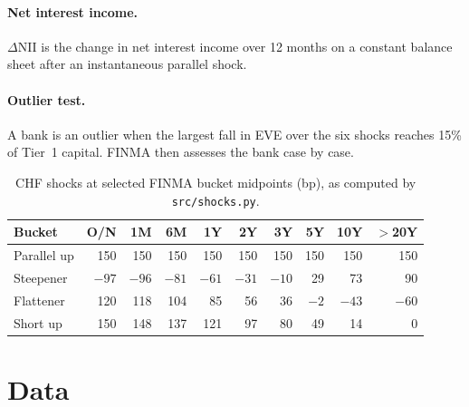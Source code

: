 \documentclass[11pt,a4paper]{article}
\newcommand{\dNII}{$\Delta$NII}
\begin{document}
\paragraph{Net interest income.} \dNII{} is the change in net interest income over 12 months on a constant balance sheet after an instantaneous parallel shock.

\paragraph{Outlier test.} A bank is an outlier when the largest fall in EVE over the six shocks reaches 15\% of Tier~1 capital. FINMA then assesses the bank case by case.

\begin{table}[h]
\centering
\caption{CHF shocks at selected FINMA bucket midpoints (bp), as computed by \texttt{src/shocks.py}.}
\label{tab:shocks}
\begin{tabular}{lrrrrrrrrr}
\toprule
Bucket & O/N & 1M & 6M & 1Y & 2Y & 3Y & 5Y & 10Y & $>$20Y \\
\midrule
Parallel up & 150 & 150 & 150 & 150 & 150 & 150 & 150 & 150 & 150 \\
Steepener & $-97$ & $-96$ & $-81$ & $-61$ & $-31$ & $-10$ & 29 & 73 & 90 \\
Flattener & 120 & 118 & 104 & 85 & 56 & 36 & $-2$ & $-43$ & $-60$ \\
Short up & 150 & 148 & 137 & 121 & 97 & 80 & 49 & 14 & 0 \\
\bottomrule
\end{tabular}
\end{table}

\section{Data}
\end{document}
